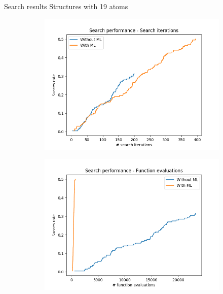 \documentclass{beamer}
\begin{document}
\begin{frame}{Search results}
Structures with 19 atoms
\begin{figure}
	\centering
	\begin{subfigure}{0.5\textwidth}
		\centering
		\includegraphics[width=\linewidth]{searchPerform_search_iter}
		\caption*{}
	\end{subfigure}%
	\begin{subfigure}{0.5\textwidth}
		\centering
		\includegraphics[width=\linewidth]{searchPerform_function_eval}
		\caption*{}
	\end{subfigure}
\end{figure}
\end{frame}
\end{document}
